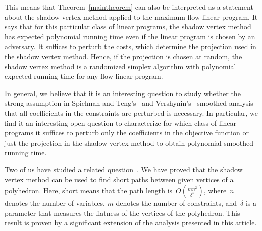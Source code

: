 \documentclass[11pt]{article}
\begin{document}
This means that Theorem~\ref{maintheorem} can also be interpreted as a statement about the shadow vertex method applied to the maximum-flow linear
program. It says that for this particular class of linear programs, the shadow vertex method has expected polynomial running time even if the linear program is chosen
by an adversary. It suffices to perturb the costs, which determine the projection used in the shadow vertex method. Hence, if the projection
is chosen at random, the shadow vertex method is a randomized simplex algorithm with polynomial expected running time
for any flow linear program. 

In general, we believe that it is an interesting question to study whether the strong assumption in Spielman and Teng's~\cite{DBLP:journals/jacm/SpielmanT04} and 
Vershynin's~\cite{DBLP:journals/siamcomp/Vershynin09} smoothed analysis that all coefficients in the constraints are perturbed is necessary. In particular, we find
it an interesting open question to characterize for which class of linear programs it suffices to perturb only the coefficients in the objective
function or just the projection in the shadow vertex method to obtain polynomial smoothed running time.

Two of us have studied a related question~\cite{BrunschR13}. 
We have proved that the shadow vertex method can be used
to find short paths between given vertices of a polyhedron. Here, short
means that the path length is~$O(\frac{mn^2}{\delta^2})$, where~$n$ denotes the number of
variables, $m$ denotes the number of constraints, and~$\delta$ is a parameter 
that measures the flatness of the vertices of the polyhedron.
This result is proven by a significant extension of the analysis presented in this article.
\end{document}
